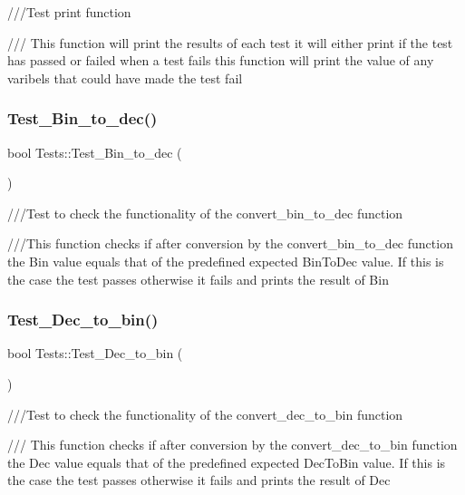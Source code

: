 ///\+Test print function 

/// This function will print the results of each test it will either print if the test has passed or failed when a test fails this function will print the value of any varibels that could have made the test fail \mbox{\label{classTests_a248d3e358bc39ec091db2e5a7f6ddd6f}} 
\subsubsection{\texorpdfstring{Test\+\_\+\+Bin\+\_\+to\+\_\+dec()}{Test\_Bin\_to\_dec()}}
{\footnotesize\ttfamily bool Tests\+::\+Test\+\_\+\+Bin\+\_\+to\+\_\+dec (\begin{DoxyParamCaption}{ }\end{DoxyParamCaption})}



///\+Test to check the functionality of the convert\+\_\+bin\+\_\+to\+\_\+dec function 

///\+This function checks if after conversion by the convert\+\_\+bin\+\_\+to\+\_\+dec function the Bin value equals that of the predefined expected Bin\+To\+Dec value. If this is the case the test passes otherwise it fails and prints the result of Bin \mbox{\label{classTests_af1957c73de97f80003a4352e499b04c1}} 
\subsubsection{\texorpdfstring{Test\+\_\+\+Dec\+\_\+to\+\_\+bin()}{Test\_Dec\_to\_bin()}}
{\footnotesize\ttfamily bool Tests\+::\+Test\+\_\+\+Dec\+\_\+to\+\_\+bin (\begin{DoxyParamCaption}{ }\end{DoxyParamCaption})}



///\+Test to check the functionality of the convert\+\_\+dec\+\_\+to\+\_\+bin function 

/// This function checks if after conversion by the convert\+\_\+dec\+\_\+to\+\_\+bin function the Dec value equals that of the predefined expected Dec\+To\+Bin value. If this is the case the test passes otherwise it fails and prints the result of Dec \mbox{\label{classTests_ab270a477241bfe006f3e1803108c3b16}} 
